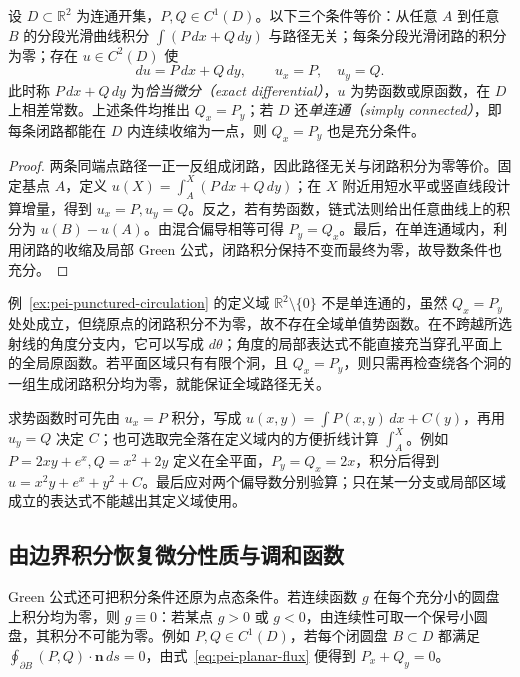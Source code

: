 \begin{theorem}
\label{thm:pei-path-independent}
设 $D\subset\mathbb R^2$ 为连通开集，$P,Q\in C^1(D)$。以下三个条件等价：从任意 $A$ 到任意 $B$ 的分段光滑曲线积分 $\int(P\,dx+Q\,dy)$ 与路径无关；每条分段光滑闭路的积分为零；存在 $u\in C^2(D)$ 使
\begin{equation}
\label{eq:pei-exact-differential}
du=P\,dx+Q\,dy,\qquad u_x=P,\quad u_y=Q.
\end{equation}
此时称 $P\,dx+Q\,dy$ 为\emph{恰当微分（exact differential）}，$u$ 为势函数或原函数，在 $D$ 上相差常数。上述条件均推出 $Q_x=P_y$；若 $D$ 还\emph{单连通（simply connected）}，即每条闭路都能在 $D$ 内连续收缩为一点，则 $Q_x=P_y$ 也是充分条件。
\end{theorem}
\begin{proof}
两条同端点路径一正一反组成闭路，因此路径无关与闭路积分为零等价。固定基点 $A$，定义 $u(X)=\int_A^X(P\,dx+Q\,dy)$；在 $X$ 附近用短水平或竖直线段计算增量，得到 $u_x=P,u_y=Q$。反之，若有势函数，链式法则给出任意曲线上的积分为 $u(B)-u(A)$。由混合偏导相等可得 $P_y=Q_x$。最后，在单连通域内，利用闭路的收缩及局部 Green 公式，闭路积分保持不变而最终为零，故导数条件也充分。
\end{proof}

例~\ref{ex:pei-punctured-circulation} 的定义域 $\mathbb R^2\setminus\{0\}$ 不是单连通的，虽然 $Q_x=P_y$ 处处成立，但绕原点的闭路积分不为零，故不存在全域单值势函数。在不跨越所选射线的角度分支内，它可以写成 $d\theta$；角度的局部表达式不能直接充当穿孔平面上的全局原函数。若平面区域只有有限个洞，且 $Q_x=P_y$，则只需再检查绕各个洞的一组生成闭路积分均为零，就能保证全域路径无关。

求势函数时可先由 $u_x=P$ 积分，写成 $u(x,y)=\int P(x,y)\,dx+C(y)$，再用 $u_y=Q$ 决定 $C$；也可选取完全落在定义域内的方便折线计算 $\int_A^X$。例如 $P=2xy+e^x,Q=x^2+2y$ 定义在全平面，$P_y=Q_x=2x$，积分后得到 $u=x^2y+e^x+y^2+C$。最后应对两个偏导数分别验算；只在某一分支或局部区域成立的表达式不能越出其定义域使用。

\subsection{由边界积分恢复微分性质与调和函数}

Green 公式还可把积分条件还原为点态条件。若连续函数 $g$ 在每个充分小的圆盘上积分均为零，则 $g\equiv0$：若某点 $g>0$ 或 $g<0$，由连续性可取一个保号小圆盘，其积分不可能为零。例如 $P,Q\in C^1(D)$，若每个闭圆盘 $B\subset D$ 都满足 $\oint_{\partial B}(P,Q)\cdot\boldsymbol n\,ds=0$，由式~\eqref{eq:pei-planar-flux} 便得到 $P_x+Q_y=0$。

